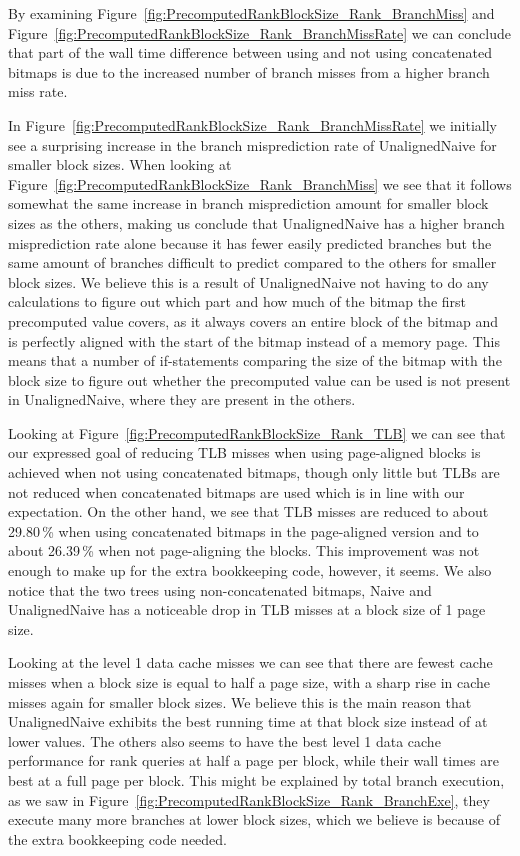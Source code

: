 By examining Figure~\ref{fig:PrecomputedRankBlockSize_Rank_BranchMiss} and Figure~\ref{fig:PrecomputedRankBlockSize_Rank_BranchMissRate} we can conclude that part of the wall time difference between using and not using concatenated bitmaps is due to the increased number of branch misses from a higher branch miss rate.

In Figure~\ref{fig:PrecomputedRankBlockSize_Rank_BranchMissRate} we initially see a surprising increase in the branch misprediction rate of UnalignedNaive for smaller block sizes.
When looking at Figure~\ref{fig:PrecomputedRankBlockSize_Rank_BranchMiss} we see that it follows somewhat the same increase in branch misprediction amount for smaller block sizes as the others, making us conclude that UnalignedNaive has a higher branch misprediction rate alone because it has fewer easily predicted branches but the same amount of branches difficult to predict compared to the others for smaller block sizes.
We believe this is a result of UnalignedNaive not having to do any calculations to figure out which part and how much of the bitmap the first precomputed value covers, as it always covers an entire block of the bitmap and is perfectly aligned with the start of the bitmap instead of a memory page.
This means that a number of if-statements comparing the size of the bitmap with the block size to figure out whether the precomputed value can be used is not present in UnalignedNaive, where they are present in the others.

Looking at Figure~\ref{fig:PrecomputedRankBlockSize_Rank_TLB} we can see that our expressed goal of reducing TLB misses when using page-aligned blocks is achieved when not using concatenated bitmaps, though only little but TLBs are not reduced when concatenated bitmaps are used which is in line with our expectation.
On the other hand, we see that TLB misses are reduced to about 29.80\,\% when using concatenated bitmaps in the page-aligned version and to about 26.39\,\% when not page-aligning the blocks.
This improvement was not enough to make up for the extra bookkeeping code, however, it seems.
We also notice that the two trees using non-concatenated bitmaps, Naive and UnalignedNaive has a noticeable drop in TLB misses at a block size of 1 page size.


Looking at the level 1 data cache misses we can see that there are fewest cache misses when a block size is equal to half a page size, with a sharp rise in cache misses again for smaller block sizes.
We believe this is the main reason that UnalignedNaive exhibits the best running time at that block size instead of at lower values.
The others also seems to have the best level 1 data cache performance for rank queries at half a page per block, while their wall times are best at a full page per block.
This might be explained by total branch execution, as we saw in Figure~\ref{fig:PrecomputedRankBlockSize_Rank_BranchExe}, they execute many more branches at lower block sizes, which we believe is because of the extra bookkeeping code needed.


